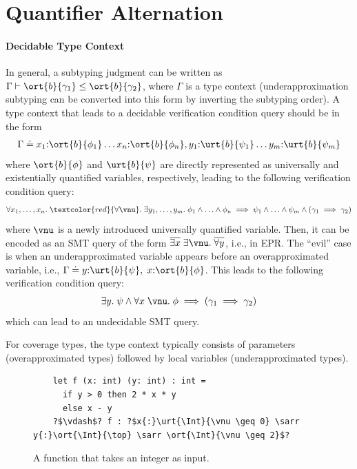\section{Quantifier Alternation}

\paragraph{Decidable Type Context} In general, a subtyping judgment can be written as $\Gamma \vdash \ort{b}{\gamma_1} \leq \ort{b}{\gamma_2}$, where $\Gamma$ is a type context (underapproximation subtyping can be converted into this form by inverting the subtyping order). A type context that leads to a decidable verification condition query should be in the form
\begin{align*}
    \Gamma \doteq x_1{:}\ort{b}{\phi_1} \ldots x_n{:}\ort{b}{\phi_n}, y_1{:}\urt{b}{\psi_1} \ldots y_m{:}\urt{b}{\psi_m}
\end{align*}\noindent
where $\ort{b}{\phi}$ and $\urt{b}{\psi}$ are directly represented as universally and existentially quantified variables, respectively, leading to the following verification condition query:
\begin{align*}
    \forall x_1, \ldots, x_n.\; \textcolor{red}{\forall \vnu}.\; \exists y_1, \ldots, y_m.\; \phi_1 \land \ldots \land \phi_n \implies \psi_1 \land \ldots \land \psi_m \land (\gamma_1 \implies \gamma_2)
\end{align*}\noindent
where $\vnu$ is a newly introduced universally quantified variable. Then, it can be encoded as an SMT query of the form $\overline{\exists x}\; \exists \vnu.\; \overline{\forall y}$, i.e., in EPR. The ``evil'' case is when an underapproximated variable appears before an overapproximated variable, i.e., $\Gamma \doteq y{:}\urt{b}{\psi},\; x{:}\ort{b}{\phi}$. This leads to the following verification condition query:
\begin{align*}
    \exists y.\; \psi \land \forall x\;\vnu.\; \phi \implies (\gamma_1 \implies \gamma_2)
\end{align*}\noindent
which can lead to an undecidable SMT query.

 For coverage types, the type context typically consists of parameters (overapproximated types) followed by local variables (underapproximated types).

\begin{figure}[h]
    \centering
    \begin{verbatim}
    let f (x: int) (y: int) : int =
      if y > 0 then 2 * x * y
      else x - y
    ?$\vdash$? f : ?$x{:}\urt{\Int}{\vnu \geq 0} \sarr y{:}\ort{\Int}{\top} \sarr \ort{\Int}{\vnu \geq 2}$?
    \end{verbatim}
    \caption{A function that takes an integer as input.}
    \label{fig:quantifier-alternation}
\end{figure}

